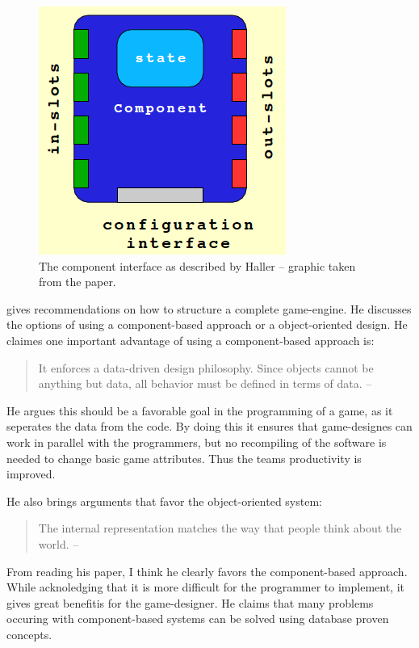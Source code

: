 \begin{figure}[!htb]
\center
\includegraphics[scale=0.4]{pics/component}
\caption{The component interface as described by Haller \cite{Fh02ageneric} -- graphic taken from the paper.}
\label{fig:component}
\end{figure}

\cite{Doherty_2003} gives recommendations on how to structure a complete game-engine. He discusses the options of using
a component-based approach or a object-oriented design. He claimes one important advantage of using a component-based approach is:
\begin{quote}
It enforces a data-driven design philosophy. Since objects cannot be anything but data, all behavior must
be defined in terms of data. -- \cite[Page 4]{Doherty_2003}
\end{quote}
He argues this should be a favorable goal in the programming of a game, as it seperates the data from the code. By doing this it
ensures that game-designes can work in parallel with the programmers, but no recompiling of the software is needed to
change basic game attributes. Thus the teams productivity is improved.

He also brings arguments that favor the object-oriented system:
\begin{quote}
The internal representation matches the way that people think about the world. -- \cite[Page 4]{Doherty_2003}
\end{quote}

From reading his paper, I think he clearly favors the component-based approach. While acknoledging that it is more
difficult for the programmer to implement, it gives great benefitis for the game-designer. He claims that many problems
occuring with component-based systems can be solved using database proven concepts.



